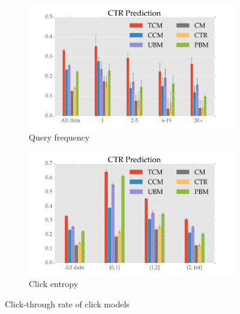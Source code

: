 \begin{figure}
	\centering
	\begin{subfigure}[b]{.49\textwidth}
		\centering
		\includegraphics[width=\textwidth]{figures/CTRPred_qf.pdf}
		\caption{Query frequency}
		\label{fig:ctr_qf}
	\end{subfigure}
	\begin{subfigure}[b]{.49\textwidth}
		\centering
		\includegraphics[width=\textwidth]{figures/CTRPred_ce.pdf}
		\caption{Click entropy}
		\label{fig:ctr_ce}
	\end{subfigure}
	\caption{Click-through rate of click models}
	\label{fig:ctr}
\end{figure}

